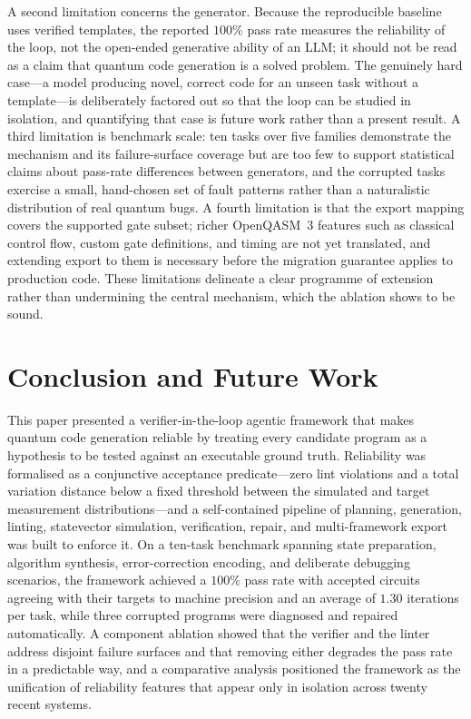 \documentclass[11pt,a4paper]{article}
\newcounter{algo}
\begin{document}
A second limitation concerns the generator. Because the reproducible baseline uses verified templates, the reported $100\%$ pass rate measures the reliability of the loop, not the open-ended generative ability of an LLM; it should not be read as a claim that quantum code generation is a solved problem. The genuinely hard case---a model producing novel, correct code for an unseen task without a template---is deliberately factored out so that the loop can be studied in isolation, and quantifying that case is future work rather than a present result. A third limitation is benchmark scale: ten tasks over five families demonstrate the mechanism and its failure-surface coverage but are too few to support statistical claims about pass-rate differences between generators, and the corrupted tasks exercise a small, hand-chosen set of fault patterns rather than a naturalistic distribution of real quantum bugs. A fourth limitation is that the export mapping covers the supported gate subset; richer OpenQASM~3 features such as classical control flow, custom gate definitions, and timing are not yet translated, and extending export to them is necessary before the migration guarantee applies to production code. These limitations delineate a clear programme of extension rather than undermining the central mechanism, which the ablation shows to be sound.

\section{Conclusion and Future Work}
\label{sec:conclusion}

This paper presented a verifier-in-the-loop agentic framework that makes quantum code generation reliable by treating every candidate program as a hypothesis to be tested against an executable ground truth. Reliability was formalised as a conjunctive acceptance predicate---zero lint violations and a total variation distance below a fixed threshold between the simulated and target measurement distributions---and a self-contained pipeline of planning, generation, linting, statevector simulation, verification, repair, and multi-framework export was built to enforce it. On a ten-task benchmark spanning state preparation, algorithm synthesis, error-correction encoding, and deliberate debugging scenarios, the framework achieved a $100\%$ pass rate with accepted circuits agreeing with their targets to machine precision and an average of $1.30$ iterations per task, while three corrupted programs were diagnosed and repaired automatically. A component ablation showed that the verifier and the linter address disjoint failure surfaces and that removing either degrades the pass rate in a predictable way, and a comparative analysis positioned the framework as the unification of reliability features that appear only in isolation across twenty recent systems.
\end{document}

